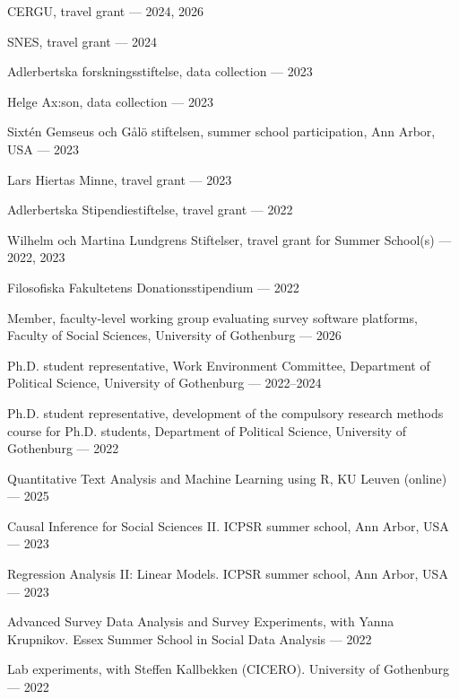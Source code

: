 \documentclass[11pt]{article}
\begin{document}
\begin{cvlist}
  \item CERGU, travel grant --- 2024, 2026
  \item SNES, travel grant --- 2024
  \item Adlerbertska forskningsstiftelse, data collection --- 2023
  \item Helge Ax:son, data collection --- 2023
  \item Sixt\'en Gemseus och G\r{a}l\"o stiftelsen, summer school participation, Ann Arbor, USA --- 2023
  \item Lars Hiertas Minne, travel grant --- 2023
  \item Adlerbertska Stipendiestiftelse, travel grant --- 2022
  \item Wilhelm och Martina Lundgrens Stiftelser, travel grant for Summer School(s) --- 2022, 2023
  \item Filosofiska Fakultetens Donationsstipendium --- 2022
\end{cvlist}

\begin{cvlist}
  \item Member, faculty-level working group evaluating survey software platforms, Faculty of Social Sciences, University of Gothenburg --- 2026
  \item Ph.D. student representative, Work Environment Committee, Department of Political Science, University of Gothenburg --- 2022--2024
  \item Ph.D. student representative, development of the compulsory research methods course for Ph.D. students, Department of Political Science, University of Gothenburg --- 2022
\end{cvlist}

\begin{cvlist}
  \item Quantitative Text Analysis and Machine Learning using R, KU Leuven (online) --- 2025
  \item Causal Inference for Social Sciences II. ICPSR summer school, Ann Arbor, USA --- 2023
  \item Regression Analysis II: Linear Models. ICPSR summer school, Ann Arbor, USA --- 2023
  \item Advanced Survey Data Analysis and Survey Experiments, with Yanna Krupnikov. Essex Summer School in Social Data Analysis --- 2022
  \item Lab experiments, with Steffen Kallbekken (CICERO). University of Gothenburg --- 2022
\end{cvlist}
\end{document}
